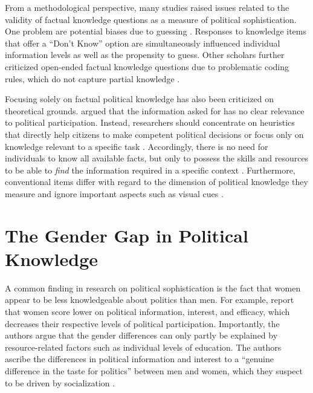 \documentclass[12pt]{article}
\begin{document}
From a methodological perspective, many studies raised issues related to the validity of factual knowledge questions as a measure of political sophistication. One problem  are potential biases due to guessing \citep{mondak2000reconsidering,mondak2001developing,mondak2001asked,miller2008experimenting}. Responses to knowledge items that offer a ``Don't Know'' option are simultaneously influenced individual information levels as well as the propensity to guess. Other scholars further criticized open-ended factual knowledge questions due to problematic coding rules, which do not capture partial knowledge \citep{krosnick2008problems,gibson2009knowing,debell2013harder}.

Focusing solely on factual political knowledge has also been criticized on theoretical grounds. \citet{lupia2006elitism} argued that the information asked for has no clear relevance to political participation. Instead, researchers should concentrate on heuristics that directly help citizens to make competent political decisions or focus only on knowledge relevant to a specific task \citep[see also][]{lupia1994shortcuts}. Accordingly, there is no need for individuals to know all available facts, but only to possess the skills and resources to be able to \textit{find} the information required in a specific context \citep{prior2008money}. Furthermore, conventional items differ with regard to the dimension of political knowledge they measure \citep{barabas2014question} and ignore important aspects such as visual cues \citep{prior2014visual}.


\section*{The Gender Gap in Political Knowledge}

A common finding in research on political sophistication is the fact that women appear to be less knowledgeable about politics than men. For example, \citet{verba1997knowing} report that women score lower on political information, interest, and efficacy, which decreases their respective levels of political participation. Importantly, the authors argue that the gender differences can only partly be explained by resource-related factors such as individual levels of education. The authors ascribe the differences in political information and interest to a ``genuine difference in the taste for politics'' between men and women, which they suspect to be driven by socialization \citep[see also][]{wolak2011roots}.
\end{document}
